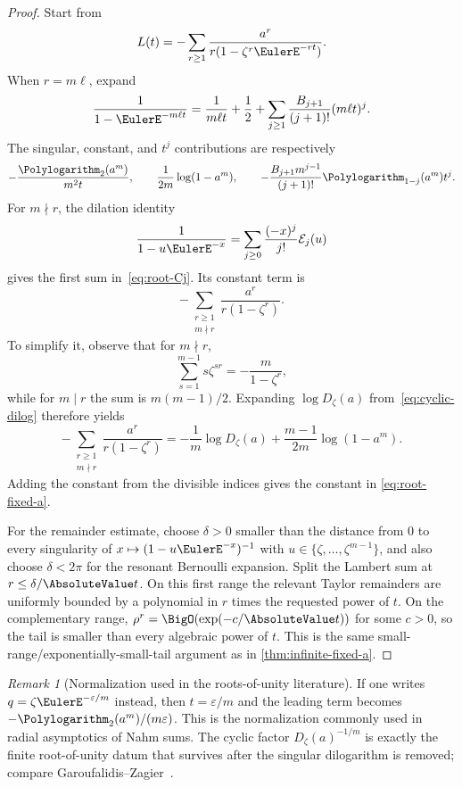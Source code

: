 \documentclass[11pt,oneside]{article}
\theoremstyle{definition}
\theoremstyle{remark}
\newtheorem{remark}[theorem]{Remark}
\newcommand{\eps}{\varepsilon}
\begin{document}
\begin{proof}
Start from
\[
 L(t)=-\sum_{r\ge1}\frac{a^r}{r(1-\zeta^r\EulerE^{-rt})}.
\]
When $r=m\ell$, expand
\[
 \frac1{1-\EulerE^{-m\ell t}}
 =\frac1{m\ell t}+\frac12+
 \sum_{j\ge1}\frac{B_{j+1}}{(j+1)!}(m\ell t)^j.
\]
The singular, constant, and $t^j$ contributions are respectively
\[
 -\frac{\Polylogarithm_2(a^m)}{m^2t},
 \qquad
 \frac1{2m}\log(1-a^m),
 \qquad
 -\frac{B_{j+1}m^{j-1}}{(j+1)!}\Polylogarithm_{1-j}(a^m)t^j.
\]
For $m\nmid r$, the dilation identity
\[
 \frac1{1-u\EulerE^{-x}}
 =\sum_{j\ge0}\frac{(-x)^j}{j!}\mathcal E_j(u)
\]
gives the first sum in~\eqref{eq:root-Cj}.  Its constant term is
\[
 -\sum_{\substack{r\ge1\\m\nmid r}}
 \frac{a^r}{r(1-\zeta^r)}.
\]
To simplify it, observe that for $m\nmid r$,
\[
 \sum_{s=1}^{m-1}s\zeta^{sr}=-\frac{m}{1-\zeta^r},
\]
while for $m\mid r$ the sum is $m(m-1)/2$.  Expanding
$\log D_\zeta(a)$ from~\eqref{eq:cyclic-dilog} therefore yields
\[
 -\sum_{\substack{r\ge1\\m\nmid r}}
 \frac{a^r}{r(1-\zeta^r)}
 =-\frac1m\log D_\zeta(a)
 +\frac{m-1}{2m}\log(1-a^m).
\]
Adding the constant from the divisible indices gives the constant in
\eqref{eq:root-fixed-a}.

For the remainder estimate, choose $\delta>0$ smaller than the distance from
$0$ to every singularity of
$x\mapsto(1-u\EulerE^{-x})^{-1}$ with
$u\in\{\zeta,\ldots,\zeta^{m-1}\}$, and also choose $\delta<2\pi$ for the
resonant Bernoulli expansion.  Split the Lambert sum at
$r\le\delta/\AbsoluteValue t$.  On this first range the relevant Taylor remainders are
uniformly bounded by a polynomial in $r$ times the requested power of $t$.
On the complementary range, $\rho^r=\BigO(\exp(-c/\AbsoluteValue t))$ for some $c>0$,
so the tail is smaller than every algebraic power of $t$.  This is the same
small-range/exponentially-small-tail argument as in
\cref{thm:infinite-fixed-a}.
\end{proof}

\begin{remark}[Normalization used in the roots-of-unity literature]
If one writes $q=\zeta\EulerE^{-\eps/m}$ instead, then $t=\eps/m$ and the leading
term becomes $-\Polylogarithm_2(a^m)/(m\eps)$.  This is the normalization commonly used
in radial asymptotics of Nahm sums.  The cyclic factor
$D_\zeta(a)^{-1/m}$ is exactly the finite root-of-unity datum that survives
after the singular dilogarithm is removed; compare
Garoufalidis--Zagier~\cite{GaroufalidisZagier}.
\end{remark}
\end{document}
